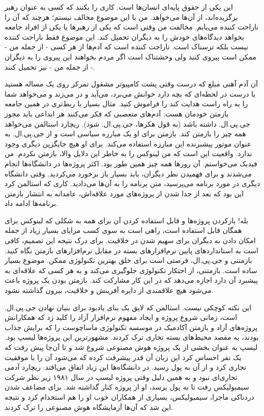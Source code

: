 این یکی از حقوق پایه‌ای انسان‌ها است. کاری را بکنند که کسی به عنوان رهبر
برگزیده‌اند، از آن‌ها می‌خواهد. من با این موضوع مخالف نیستم؛ هرچند که آن
را ناراحت کننده می‌یابم. مخالفت من وقتی است که یکی از رهبرها یا یکی از
افراد جامعه بخواهد دیدگاه‌های خودش را به دیگران تحمیل کند. این موضوع
فقط ناراحت کننده نیست بلکه ترسناک است. ناراحت کننده است که آدم‌ها از هر
کسی - از جمله من - ممکن است پیروی کنند ولی وحشتناک‌ است اگر مردم
بخواهند این پیروی را به دیگران - از جمله من - نیز تحمیل کنند.

آن آدم آهنی مبلغ که درست وقتی پشت کامپیوتر مشغول تمرکز روی یک مساله
هستید یا درست در لحظه‌ای که بچه دارد خوابش می‌برد، می‌آید و در می‌زند و
می‌خواهد شما را به راه راست هدایت کند را فراموش کنید. مثال بسیار با
ربط‌تری در همین جامعه بازمتن خودمان هست: آدم‌های متعصبی که فکر می‌کنند هر
ابداعی باید مجوز جی.پی.ال. داشته باشد (به قول هکرها،
جی.پی.ال. شود). ریچارد استالمن می‌خواهد همه چیز را بازمتن کند. بازمتن
برای او یک مبارزه سیاسی است و از جی.پی.ال. به عنوان موتور پیشبرنده این
مبارزه استفاده می‌کند. برای او هیچ جایگزین دیگری وجود ندارد. واقعیت این
است که من لینوکس را به خاطر این دلایل والا، بازمتن نکردم. من فیدبک
می‌خواستم. آن روزها همه چیز همین طور بود. اکثر پروژه‌ها در دانشگاه‌ها
انجام می‌شدند و برای فهمیدن نظر دیگران، باید بسیار باز برخورد
می‌کردید. وقتی دانشگاه دیگری در مورد برنامه می‌پرسید، متن برنامه را به
آن‌ها می‌دادید. کاری که استالمن کرد این بود که بعد از جدا شدن از
پروژه‌های مورد علاقه‌اش، عامدانه به انتشار بازمتن برنامه‌ها ادامه داد.

بله! بازکردن پروژه‌ها و قابل استفاده کردن آن برای همه به شکلی که لینوکس
برای همگان قابل استفاده است، راهی است به سوی کسب مزایای بسیار زیاد از
جمله امکان دادن به دیگران برای سهیم شدن در خلاقیت. برای درک نتیجه این
تصمیم، کافی است به استانداردهای پایین نرم‌افزارهای بسته در مقابل
نرم‌افزارهای بازمتن نگاه کنید. بازمتنی و جی.پی.ال، فرصتی است برای خلق
بهترین تکنولوژی ممکن. موضوع بسیار ساده است. بازمتنی، از احتکار
تکنولوژی جلوگیری می‌کند و به هر کسی که علاقه‌ای به پیشبرد آن دارد اجازه
می‌دهد که در این کار مشارکت کند. بازمتن بودن یک پروژه باعث می‌شود هیچ
علاقمندی از دایره آفرینش و خلاقیت، بیرون گذاشته نشود.

این نکته کوچکی نیست. استالمن که لایق یک بنای یادبود برای بنیان نهادن
جی.پی.ال. است، زمانی شروع پروژه و ایجاد مفهوم نرم‌افزار آزاد را کلید زد
که همکارانش پروژه‌های آزاد و بازمتن آکادمیک در موسسه تکنولوژی
ماساچوست را که برایش جذاب
بودند، به مقصد محیط‌های بسته تجاری ترک کردند. مشهورترین این پروژه‌ها
لیسپ
بود. لیسپ به عنوان بخشی از یک پروژه هوش مصنوعی شروع شد و تا آن‌جا پیش
رفت که یک نفر احساس کرد این زبان آن قدر پیشرفت کرده که می‌شود آن را با
موفقیت تجاری کرد و از آن به پول رسید. در دانشگاه‌ها این زیاد اتفاق
می‌افتد. ریچارد آدمی تجاری‌ای نبود و به همین دلیل وقتی پروژه لیسپ در سال
۱۹۸۱ زیر نظر شرکت سیمبولیکس رفت تا به پول برسد،
او از پروژه کنار گذاشته شد. برای مضاعف شدن دردناکی ماجرا، سیمبولیکس،
بسیاری از همکاران خوب او را هم استخدام کرد و نتیجه این شد که آن‌ها
آزمایشگاه هوش مصنوعی را ترک کردند.

